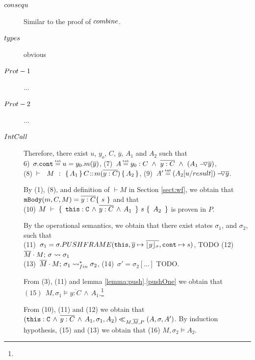 \begin{description}
\item[${\sc{consequ}}$] Similar to the proof of  ${\sc{combine}}$. 

\item[${\sc{types}}$] obvious

\item[${\sc{Prot-1}}$] ...

\item[${\sc{Prot-2}}$] ...

\item[${\sc{IntCall}}$]

Therefore, there exist $u$, $y_o$, $C$, $\overline y$,  $A_1$ and $A_2$ such that \\
6)\ $\sigma.\prg{cont}\txteq u=y_0.m(\overline y)$,   \hspace{2cm}
 (7)\ $A \txteq y_0:C  \ \wedge\ \overline {y:C}\ \wedge \  (\PushAS  {y} {A_1})$, 
\\
 (8)\ ${\vdash \ \ M\ \ \mathbf{:}\ \  \{\, A_1\, \}\, C\!::\!m(\overline{y:C})\, \{\,   {A_2}\, \}  }$,    \hspace{1cm}
 (9)\ $A' \txteq  {\PushAS  {y} {(A_2[ u/result])}}$. 

By (1), (8), and definition of $\vdash M$ in Section \ref{sect:wf}, we obtain that   $\prg{mBody}(m,C,M)=\overline{y:C}\{\  s \ \}$ and that\\
(10)   ${M\ \vdash\ \{\, \ \mbox{\normalfont{\texttt{this}}}:\mbox{\normalfont{\texttt{C}}}\, \wedge\, \overline{y:C}\, \wedge\, A_1\  \, \} \ s\  \{\,\ A_2\ \, \} }$ is proven in $P$.
 
 By the operational semantics, we obtain that there exist states $\sigma_1$, and $\sigma_2$, such that \\
 (11)\ $\sigma_1=\sigma.PUSHFRAME(\mbox{\normalfont{\texttt{this}}}, {\overline y} \mapsto \overline{\lfloor y \rfloor_{\sigma}},\mbox{\normalfont{\texttt{cont}}} \mapsto s) $, TODO   \hspace{1cm}
   (12)\ $\overline{M}\cdot M;\, {\sigma} \rightsquigarrow \sigma_1$ \\
 (13)\ $\overline{M}\cdot M;\, {\sigma_1} \rightsquigarrow^*_{fin} \sigma_2$,   \hspace{3cm}
 (14)\ $\sigma'=\sigma_2[...]$ TODO.
 
 From (3), (11) and lemma \ref{lemma:push}.\ref{pushOne}  we obtain that \ \ \  $ (15) \ \ M, \sigma_1 \models \overline{y:C}\, \wedge\, A_1$.\footnote{}
 
 From (10), (11) and (12) we obtain that $( \mbox{\normalfont{\texttt{this}}}:\mbox{\normalfont{\texttt{C}}}\, \wedge\, \overline{y:C}\, \wedge\, A_1,\sigma_1,A_2) \ll_{M,\overline{M},P} (A,\sigma,A')$. By induction hypothesis, (15) and (13) we obtain that (16) $M,\sigma_2 \models A_2$.
 

\end{description}
